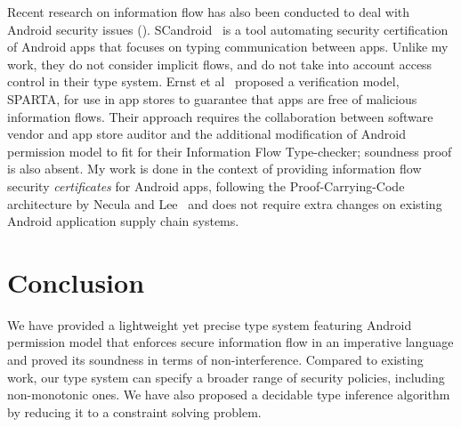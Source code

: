 {{{Recent research on information flow has also been conducted to deal
with Android security issues
(\cite{Ernst:2014,Chin:2011wa,Nadkarni:2016tf,Lortz:2014ku,Gunadi:2015,Chaudhuri:2009ii,Fuchs2010}).
SCandroid~\cite{Chaudhuri:2009ii,Fuchs2010} is a tool automating
security certification of Android apps that focuses on typing
communication between apps. Unlike my work, they do not
consider implicit flows, and do not take into account access control
in their type system. Ernst et al~\cite{Ernst:2014} proposed a
verification model, SPARTA, for use in app stores to guarantee that
apps are free of malicious information flows. Their approach requires
the collaboration between software vendor and app store auditor and
the additional modification of Android permission model to fit for
their Information Flow Type-checker;
soundness proof is also absent. My work is done in the context of
providing information flow security \emph{certificates} for Android
apps, following the Proof-Carrying-Code  architecture by
Necula and Lee~\cite{necula:pcc:1996} and does not require extra
changes on existing Android application supply chain systems.


\section{Conclusion}\label{sec:sta-	conclusion}

We have provided a lightweight yet precise type system featuring Android permission model that enforces secure information flow in an
imperative language and proved its soundness in terms of non-interference.
Compared to existing work, our type system can specify a broader range of security policies, including non-monotonic ones.
We have also proposed a decidable type inference algorithm by reducing it to a constraint solving problem.

}}}
